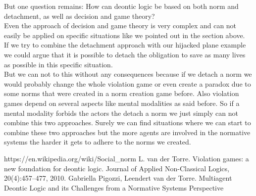 \documentclass[conference]{IEEE}
\begin{document}
But one question remains: How can deontic logic be based on both norm and detachment, as well as decision and game theory?\\
Even the approach of decision and game theory is very complex and can not easily be applied on specific situations like we pointed out in the section above.\\
If we try to combine the detachment approach with our hijacked plane example we could argue that it is possible to detach the obligation to save as many lives as possible in this specific situation.\\
But we can not to this without any consequences because if we detach a norm we would probably change the whole violation game or even create a paradox due to some norms that were created in a norm creation game before. Also violation games depend on several aspects like mental modalities as said before. So if a mental modality forbids the actors the detach a norm we just simply can not combine this two approaches.
Surely we can find situations where we can start to combine these two approaches but the more agents are involved in the normative systems the harder it gets to adhere to the norms we created.
\begin{thebibliography}{00}

 https://en.wikipedia.org/wiki/Social\_norm
 L. van der Torre. Violation games: a new foundation for deontic logic. Journal of
Applied Non-Classical Logics, 20(4):457–477, 2010.
 Gabriella Pigozzi, Leendert van der Torre. Multiagent Deontic Logic
and its Challenges
from a Normative Systems Perspective
\end{thebibliography}
\vspace{12pt}
\end{document}
